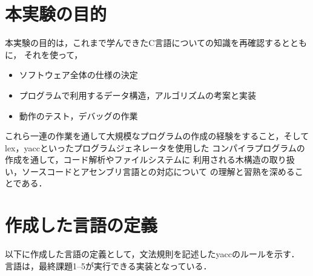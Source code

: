 

\section{本実験の目的}
本実験の目的は，これまで学んできたC言語についての知識を再確認するとともに，
それを使って，
\begin{itemize}
  \item ソフトウェア全体の仕様の決定
  \item プログラムで利用するデータ構造，アルゴリズムの考案と実装
  \item 動作のテスト，デバッグの作業
\end{itemize}
これら一連の作業を通して大規模なプログラムの作成の経験をすること，そして
lex，yaccといったプログラムジェネレータを使用した
コンパイラプログラムの作成を通して，コード解析やファイルシステムに
利用される木構造の取り扱い，ソースコードとアセンブリ言語との対応について
の理解と習熟を深めることである．

\section{作成した言語の定義}
以下に作成した言語の定義として，文法規則を記述したyaccのルールを示す．
言語は，最終課題1--5が実行できる実装となっている．

